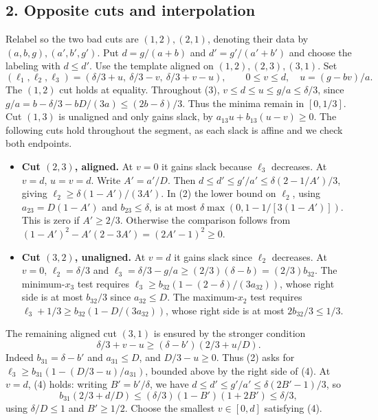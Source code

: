 \documentclass[
  10pt,
]{article}
\providecommand{\tightlist}{%
  \setlength{\itemsep}{0pt}\setlength{\parskip}{0pt}}
\begin{document}
\subsection{2. Opposite cuts and
interpolation}\label{opposite-cuts-and-interpolation}

Relabel so the two bad cuts are \((1,2),(2,1)\), denoting their data by
\((a,b,g),(a',b',g')\). Put \(d=g/(a+b)\) and \(d'=g'/(a'+b')\) and
choose the labeling with \(d\le d'\). Use the template aligned on
\((1,2),(2,3),(3,1)\). Set \[
(\ell_1,\ell_2,\ell_3)=(\delta/3+u,\ \delta/3-v,\ \delta/3+v-u),\qquad
0\le v\le d,\quad u=(g-bv)/a. \tag{3}
\] The \((1,2)\) cut holds at equality. Throughout (3),
\(v\le d\le u\le g/a\le\delta/3\), since
\(g/a=b-\delta/3-bD/(3a)\le(2b-\delta)/3\). Thus the minima remain in
\([0,1/3]\). Cut \((1,3)\) is unaligned and only gains slack, by
\(a_{13}u+b_{13}(u-v)\ge0\). The following cuts hold throughout the
segment, as each slack is affine and we check both endpoints.

\begin{itemize}
\tightlist
\item
  \textbf{Cut \((2,3)\), aligned.} At \(v=0\) it gains slack because
  \(\ell_3\) decreases. At \(v=d\), \(u=v=d\). Write \(A'=a'/D\). Then
  \(d\le d'\le g'/a'\le\delta(2-1/A')/3\), giving
  \(\ell_2\ge\delta(1-A')/(3A')\). In (2) the lower bound on \(\ell_2\),
  using \(a_{23}=D(1-A')\) and \(b_{23}\le\delta\), is at most
  \(\delta\max(0,1-1/[3(1-A')])\). This is zero if \(A'\ge2/3\).
  Otherwise the comparison follows from
  \((1-A')^2-A'(2-3A')=(2A'-1)^2\ge0\).
\item
  \textbf{Cut \((3,2)\), unaligned.} At \(v=d\) it gains slack since
  \(\ell_2\) decreases. At \(v=0\), \(\ell_2=\delta/3\) and
  \(\ell_3=\delta/3-g/a\ge(2/3)(\delta-b)=(2/3)b_{32}\). The
  minimum-\(x_3\) test requires
  \(\ell_3\ge b_{32}(1-(2-\delta)/(3a_{32}))\), whose right side is at
  most \(b_{32}/3\) since \(a_{32}\le D\). The maximum-\(x_2\) test
  requires \(\ell_3+1/3\ge b_{32}(1-D/(3a_{32}))\), whose right side is
  at most \(2b_{32}/3\le1/3\).
\end{itemize}

The remaining aligned cut \((3,1)\) is ensured by the stronger condition
\[
 \delta/3+v-u\ge(\delta-b')(2/3+u/D). \tag{4}
\] Indeed \(b_{31}=\delta-b'\) and \(a_{31}\le D\), and \(D/3-u\ge0\).
Thus (2) asks for \(\ell_3\ge b_{31}(1-(D/3-u)/a_{31})\), bounded above
by the right side of (4). At \(v=d\), (4) holds: writing
\(B'=b'/\delta\), we have \(d\le d'\le g'/a'\le\delta(2B'-1)/3\), so \[
 b_{31}(2/3+d/D)\le(\delta/3)(1-B')(1+2B')\le\delta/3,
\] using \(\delta/D\le1\) and \(B'\ge1/2\). Choose the smallest
\(v\in[0,d]\) satisfying (4).
\end{document}
